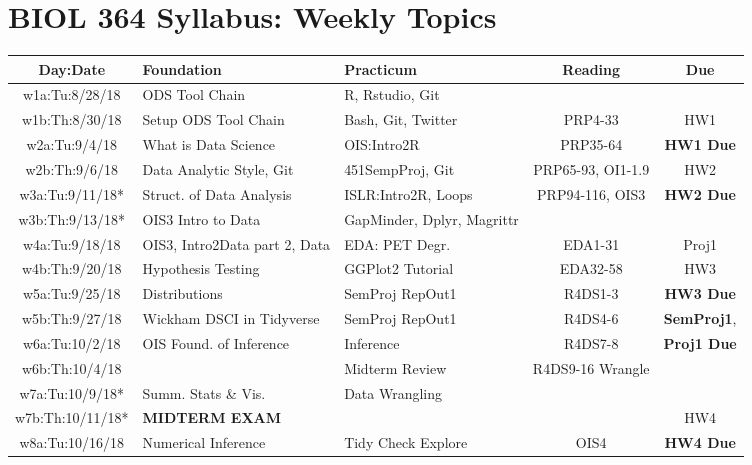 \documentclass[11pt]{article} %
\begin{document}
\section{BIOL 364 Syllabus: Weekly Topics}
\begin{table}[h] 
	\centering %
	\begin{tabular}{| c | p{3.4cm} | p{3.4cm} | c | c |} %
	\hline %
	Day:Date & Foundation & Practicum  & Reading & Due  \\ %
	\hline 
	\hline %
  w1a:Tu:8/28/18 & ODS Tool Chain & R, Rstudio, Git & & \\ %
	\hline %
	w1b:Th:8/30/18 & Setup ODS Tool Chain & Bash, Git, Twitter & PRP4-33 & HW1 \\ 
	\hline  
	\hline
	w2a:Tu:9/4/18 & What is Data Science & OIS:Intro2R  & PRP35-64 & {\bf HW1 Due} \\ 
	\hline
	w2b:Th:9/6/18 &  Data Analytic Style, Git & 451SempProj, Git & PRP65-93, OI1-1.9 & HW2 \\
	\hline 
	\hline
	w3a:Tu:9/11/18* & Struct. of Data Analysis & ISLR:Intro2R, Loops & PRP94-116, OIS3 & {\bf HW2 Due}\\ 
	\hline
	w3b:Th:9/13/18* & OIS3 Intro to Data & GapMinder, Dplyr, Magrittr &  &  \\
	\hline
	\hline 
	w4a:Tu:9/18/18 & OIS3, Intro2Data part 2, Data & EDA: PET Degr. & EDA1-31 & Proj1  \\ 
	\hline
	w4b:Th:9/20/18 & Hypothesis Testing & GGPlot2 Tutorial & EDA32-58 & HW3 \\
	\hline
	\hline 
	w5a:Tu:9/25/18 & Distributions & SemProj RepOut1  & R4DS1-3 &  {\bf HW3 Due} \\ 
	\hline
	w5b:Th:9/27/18 & Wickham DSCI in Tidyverse & SemProj RepOut1 & R4DS4-6  & {\bf SemProj1}, \\
	\hline
	\hline 
	w6a:Tu:10/2/18 & OIS Found. of Inference & Inference  & R4DS7-8 & {\bf Proj1 Due} \\ 
	\hline
	w6b:Th:10/4/18 &  & Midterm Review & R4DS9-16 Wrangle & \\
	\hline
	\hline 
	w7a:Tu:10/9/18* & Summ. Stats \& Vis.  & Data Wrangling &  & \\ 
	\hline
	w7b:Th:10/11/18* & {\bf MIDTERM EXAM} &  &  & HW4 \\
	\hline
	\hline 
	w8a:Tu:10/16/18 & Numerical Inference &  Tidy Check Explore  & OIS4 & {\bf HW4 Due}\\ 

\end{tabular}
\end{table}
\end{document}
